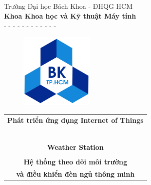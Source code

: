 \documentclass[12pt,titlepage,a4paper]{article}
\begin{document}
\begin{titlepage}
\vspace{0cm}
\begin{center}
Trường Đại học Bách Khoa - ĐHQG HCM\\
\textbf{Khoa Khoa học và Kỹ thuật Máy tính } \\
- - - - - - - - - - - -
\end{center}


\vspace{1cm}
\begin{figure}[h!]
\begin{center}
\includegraphics[width=3.6cm]{Figures/hcmut.png}
\end{center}
\end{figure}
\vspace{1cm}



\begin{center}
\begin{tabular}{c}
\multicolumn{1}{c}{\textbf{{\large Phát triển ứng dụng Internet of Things}}}\\
~~\\ %
\hline
\\
\multicolumn{1}{c}{\textbf{{\Large Weather Station}}}\\
\\
\textbf{{\Large Hệ thống theo dõi môi trường}} \\ %
\textbf{{\Large và điều khiển đèn ngủ thông minh }} %
\\[0.3cm]
\hline
\end{tabular}
\end{center}


\end{titlepage}
\end{document}
